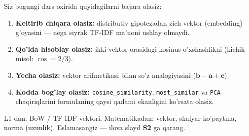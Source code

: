 \documentclass[aspectratio=169,11pt]{beamer}
\begin{document}
\begin{frame}{Siz bugungi dars oxirida quyidagilarni bajara olasiz:}
  \begin{enumerate}\setlength\itemsep{7pt}
    \item \textbf{Keltirib chiqara olasiz:} distributiv gipotezadan
          zich vektor (embedding) g'oyasini --- nega siyrak TF-IDF
          ma'noni ushlay olmaydi.
    \item \textbf{Qo'lda hisoblay olasiz:} ikki vektor orasidagi
          kosinus o'xshashlikni (kichik misol: $\cos = 2/3$).
    \item \textbf{Yecha olasiz:} vektor arifmetikasi bilan so'z
          analogiyasini ($\mathbf{b}-\mathbf{a}+\mathbf{c}$).
    \item \textbf{Kodda bog'lay olasiz:} \texttt{cosine\_similarity},
          \texttt{most\_similar} va \texttt{PCA} chaqiriqlarini
          formulaning qaysi qadami ekanligini ko'rsata olasiz.
  \end{enumerate}
  \vspace{4pt}
  \begin{tcolorbox}[defbox,title=Oldindan talab]
    \footnotesize
    L1 dan: BoW / TF-IDF vektori. Matematikadan: vektor, skalyar
    ko'paytma, norma (uzunlik). Eslamasangiz --- ilova slayd
    \textbf{S2} ga qarang.
  \end{tcolorbox}
\end{frame}
\end{document}

